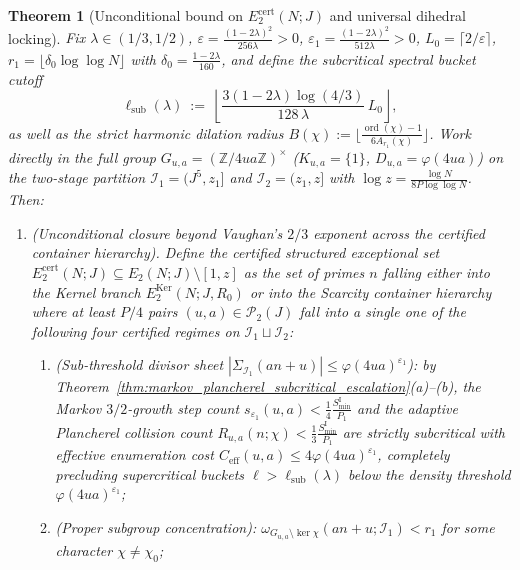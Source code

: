 \documentclass[11pt, a4paper]{article}
\theoremstyle{plain}
\newtheorem{theorem}{Theorem}[section]
\theoremstyle{definition}
\newcommand{\Z}{\mathbb{Z}}
\begin{document}
\begin{theorem}[Unconditional bound on $E_2^{\mathrm{cert}}(N;J)$ and universal dihedral locking]\label{thm:final_synthesis_and_high_prime_reduction}
Fix $\lambda\in(1/3,1/2)$, $\varepsilon=\frac{(1-2\lambda)^{2}}{256\lambda}>0$, $\varepsilon_1=\frac{(1-2\lambda)^{2}}{512\lambda}>0$, $L_0=\lceil 2/\varepsilon\rceil$, $r_1=\lfloor\delta_0\log\log N\rfloor$ with $\delta_0=\frac{1-2\lambda}{160}$, and define the subcritical spectral bucket cutoff
\begin{equation}\label{eq:ell_sub_def}
\ell_{\mathrm{sub}}(\lambda)\ :=\ \left\lfloor\frac{3(1-2\lambda)\log(4/3)}{128\,\lambda}\,L_0\right\rfloor,
\end{equation}
as well as the strict harmonic dilation radius $B(\chi):=\big\lfloor\frac{\operatorname{ord}(\chi)-1}{6A_{r_1}(\chi)}\big\rfloor$. Work directly in the full group $G_{u,a}=(\Z/4ua\Z)^{\times}$ ($K_{u,a}=\{1\}$, $D_{u,a}=\varphi(4ua)$) on the two-stage partition $\mathcal{I}_1=(J^{5},z_1]$ and $\mathcal{I}_2=(z_1,z]$ with $\log z=\allowbreak\frac{\log N}{8P\log\log N}$. Then:
\begin{enumerate}[label=(\alph*)]
    \item \emph{(Unconditional closure beyond Vaughan's $2/3$ exponent across the certified container hierarchy).} 
    Define the certified structured exceptional set $E_2^{\mathrm{cert}}(N;J)\subseteq E_2(N;J)\setminus[1,z]$ as the set of primes $n$ falling either into the Kernel branch $E_2^{\mathrm{Ker}}(N;J,R_0)$ or into the Scarcity container hierarchy where at least $P/4$ pairs $(u,a)\in\mathcal{P}_2(J)$ fall into a single one of the following four certified regimes on $\mathcal{I}_1\sqcup\mathcal{I}_2$:
    \begin{enumerate}[label=(\roman*)]
        \item \emph{(Sub-threshold divisor sheet $|\Sigma_{\mathcal{I}_1}(an+u)|\le\varphi(4ua)^{\varepsilon_1}$)}: 
        by Theorem~\ref{thm:markov_plancherel_subcritical_escalation}(a)--(b), the Markov $3/2$-growth step count $s_{\varepsilon_1}(u,a)<\frac14\frac{S_{\min}^{\mathrm{I}}}{P_1}$ and the adaptive Plancherel collision count $R_{u,a}(n;\chi)<\frac13\frac{S_{\min}^{\mathrm{I}}}{P_1}$ are strictly subcritical with effective enumeration cost $C_{\mathrm{eff}}(u,a)\le 4\varphi(4ua)^{\varepsilon_1}$, completely precluding supercritical buckets $\ell>\ell_{\mathrm{sub}}(\lambda)$ below the density threshold $\varphi(4ua)^{\varepsilon_1}$;
        
        \item \emph{(Proper subgroup concentration)}: 
        $\omega_{G_{u,a}\setminus\ker\chi}(an+u;\mathcal{I}_1)<r_1$ for some character $\chi\neq\chi_0$;
        

\end{enumerate}
\end{enumerate}
\end{theorem}
\end{document}
